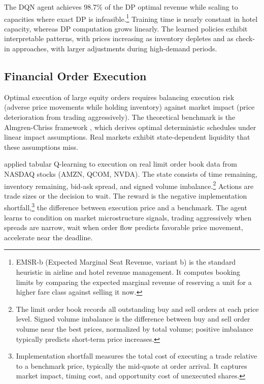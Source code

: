 The DQN agent achieves 98.7\% of the DP optimal revenue while scaling to capacities where exact DP is infeasible.\footnote{EMSR-b (Expected Marginal Seat Revenue, variant b) is the standard heuristic in airline and hotel revenue management. It computes booking limits by comparing the expected marginal revenue of reserving a unit for a higher fare class against selling it now.} Training time is nearly constant in hotel capacity, whereas DP computation grows linearly. The learned policies exhibit interpretable patterns, with prices increasing as inventory depletes and as check-in approaches, with larger adjustments during high-demand periods.


\subsection{Financial Order Execution}
\label{sec:execution}

Optimal execution of large equity orders requires balancing execution risk (adverse price movements while holding inventory) against market impact (price deterioration from trading aggressively). The theoretical benchmark is the Almgren-Chriss framework \citep{Almgren2001execution}, which derives optimal deterministic schedules under linear impact assumptions. Real markets exhibit state-dependent liquidity that these assumptions miss.

\citet{Nevmyvaka2006execution} applied tabular Q-learning to execution on real limit order book data from NASDAQ stocks (AMZN, QCOM, NVDA). The state consists of time remaining, inventory remaining, bid-ask spread, and signed volume imbalance.\footnote{The limit order book records all outstanding buy and sell orders at each price level. Signed volume imbalance is the difference between buy and sell order volume near the best prices, normalized by total volume; positive imbalance typically predicts short-term price increases.} Actions are trade sizes or the decision to wait. The reward is the negative implementation shortfall,\footnote{Implementation shortfall measures the total cost of executing a trade relative to a benchmark price, typically the mid-quote at order arrival. It captures market impact, timing cost, and opportunity cost of unexecuted shares.} the difference between execution price and a benchmark. The agent learns to condition on market microstructure signals, trading aggressively when spreads are narrow, wait when order flow predicts favorable price movement, accelerate near the deadline.

